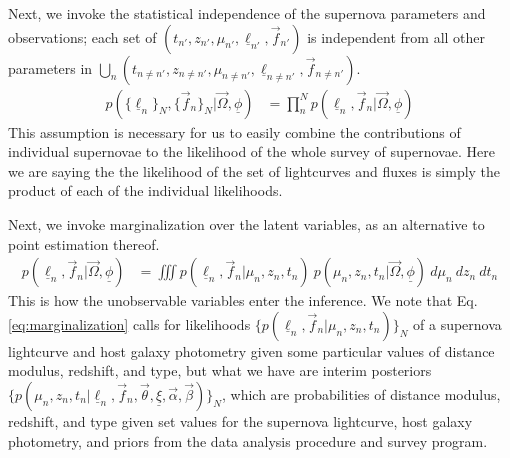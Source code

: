 \documentclass[12pt, onecolumn]{emulateapj}
\newcommand{\textul}{\underline}
\begin{document}
Next, we invoke the statistical independence of the supernova parameters and observations; each set of $(t_{n'}, z_{n'}, \mu_{n'}, \textul{\ell}_{n'}, \vec{f}_{n'})$ is independent from all other parameters in $\bigcup_{n}(t_{n\neq n'}, z_{n\neq n'}, \mu_{n\neq n'}, \textul{\ell}_{n\neq n'}, \vec{f}_{n\neq n'})$.
\begin{align}
\label{eq:independence}
p(\{\textul{\ell}_{n}\}_{N}, \{\vec{f}_{n}\}_{N} | \vec{\Omega}, \textul{\phi}) &= \prod_{n}^{N}p(\textul{\ell}_{n}, \vec{f}_{n} | \vec{\Omega}, \textul{\phi})
\end{align}
This assumption is necessary for us to easily combine the contributions of individual supernovae to the likelihood of the whole survey of supernovae. Here we are saying the the likelihood of the set of lightcurves and fluxes is simply the product of each of the individual likelihoods.

Next, we invoke marginalization over the latent variables, as an alternative to point estimation thereof.
\begin{align}
\label{eq:marginalization}
p(\textul{\ell}_{n}, \vec{f}_{n} | \vec{\Omega}, \textul{\phi}) &= \iiint p(\textul{\ell}_{n}, \vec{f}_{n} | \mu_{n}, z_{n}, t_{n})\ p(\mu_{n}, z_{n}, t_{n} | \vec{\Omega}, \textul{\phi})\ d\mu_{n}\ dz_{n}\ dt_{n}
\end{align}
This is how the unobservable variables enter the inference.  We note that Eq. \ref{eq:marginalization} calls for likelihoods $\{p(\textul{\ell}_{n}, \vec{f}_{n} | \mu_{n}, z_{n}, t_{n})\}_{N}$ of a supernova lightcurve and host galaxy photometry given some particular values of distance modulus, redshift, and type, but what we have are interim posteriors $\{p(\mu_{n}, z_{n}, t_{n} | \textul{\ell}_{n}, \vec{f}_{n}, \vec{\theta}, \textul{\xi}, \vec{\alpha}, \vec{\beta})\}_{N}$, which are probabilities of distance modulus, redshift, and type given set values for the supernova lightcurve, host galaxy photometry, and priors from the data analysis procedure and survey program.
\end{document}
